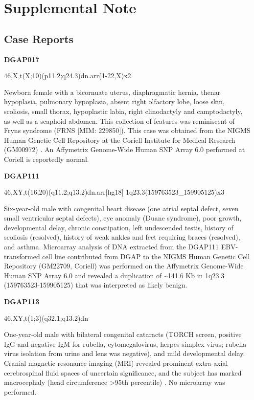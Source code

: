 \documentclass[a4paper,twoside=true,openright,parskip=full,chapterprefix=true,11pt,headings=normal,bibliography=totoc,listof=totoc,titlepage=on,captions=tableabove,draft=false]{scrreprt}
\theoremstyle{definition}
\theoremstyle{definition}
\theoremstyle{definition}
\theoremstyle{remark}
\begin{document}
\hypertarget{supplemental-note}{%
\section{Supplemental Note}\label{supplemental-note}}

\hypertarget{case-reports}{%
\subsection{Case Reports}\label{case-reports}}

\textbf{DGAP017}

46,X,t(X;10)(p11.2;q24.3)dn.arr(1-22,X)x2

Newborn female with a bicornuate uterus, diaphragmatic hernia, thenar
hypoplasia, pulmonary hypoplasia, absent right olfactory lobe, loose
skin, scoliosis, small thorax, hypoplastic labia, right clinodactyly and
camptodactyly, as well as a scaphoid abdomen. This collection of
features was reminiscent of Fryns syndrome (FRNS {[}MIM: 229850{]}).
This case was obtained from the NIGMS Human Genetic Cell Repository at
the Coriell Institute for Medical Research (GM00972) \citep{Tang2013}.
An Affymetrix Genome-Wide Human SNP Array 6.0 performed at Coriell is
reportedly normal.

\textbf{DGAP111}

46,XY,t(16;20)(q11.2;q13.2)dn.arr{[}hg18{]}
1q23.3(159763523\_159905125)x3

Six-year-old male with congenital heart disease (one atrial septal
defect, seven small ventricular septal defects), eye anomaly (Duane
syndrome), poor growth, developmental delay, chronic constipation, left
undescended testis, history of scoliosis (resolved), history of weak
ankles and feet requiring braces (resolved), and asthma. Microarray
analysis of DNA extracted from the DGAP111 EBV-transformed cell line
contributed from DGAP to the NIGMS Human Genetic Cell Repository
(GM22709, Coriell) was performed on the Affymetrix Genome-Wide Human SNP
Array 6.0 and revealed a duplication of \textasciitilde{}141.6 Kb in
1q23.3 (159763523-159905125) that was interpreted as likely benign.

\textbf{DGAP113}

46,XY,t(1;3)(q32.1;q13.2)dn

One-year-old male with bilateral congenital cataracts (TORCH screen,
positive IgG and negative IgM for rubella, cytomegalovirus, herpes
simplex virus; rubella virus isolation from urine and lens was
negative), and mild developmental delay. Cranial magnetic resonance
imaging (MRI) revealed prominent extra-axial cerebrospinal fluid spaces
of uncertain significance, and the subject has marked macrocephaly (head
circumference \textgreater{}95th percentile) \citep{Lachke2012}. No
microarray was performed.
\end{document}
